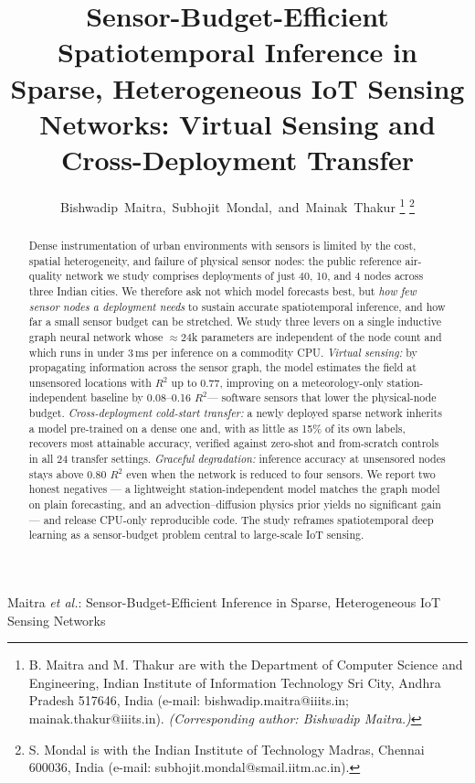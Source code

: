 \documentclass[journal]{IEEEtran}
\newcommand{\Rtwo}{\ensuremath{R^{2}}\xspace}
\begin{document}
\title{Sensor-Budget-Efficient Spatiotemporal Inference in Sparse, Heterogeneous IoT Sensing Networks: Virtual Sensing and Cross-Deployment Transfer}

\author{Bishwadip~Maitra,~Subhojit~Mondal,~and~Mainak~Thakur%
\thanks{B. Maitra and M. Thakur are with the Department of Computer Science and Engineering, Indian Institute of Information Technology Sri City, Andhra Pradesh 517646, India (e-mail: bishwadip.maitra@iiits.in; mainak.thakur@iiits.in). \emph{(Corresponding author: Bishwadip Maitra.)}}%
\thanks{S. Mondal is with the Indian Institute of Technology Madras, Chennai 600036, India (e-mail: subhojit.mondal@smail.iitm.ac.in).}%
}

%
{Maitra \MakeLowercase{\textit{et al.}}: Sensor-Budget-Efficient Inference in Sparse, Heterogeneous IoT Sensing Networks}

\maketitle

\begin{abstract}
Dense instrumentation of urban environments with sensors is limited by the cost, spatial heterogeneity, and failure of physical sensor nodes: the public reference air-quality network we study comprises deployments of just 40, 10, and 4 nodes across three Indian cities. We therefore ask not which model forecasts best, but \emph{how few sensor nodes a deployment needs} to sustain accurate spatiotemporal inference, and how far a small sensor budget can be stretched. We study three levers on a single inductive graph neural network whose ${\approx}24$k parameters are independent of the node count and which runs in under 3\,ms per inference on a commodity CPU. \emph{Virtual sensing:} by propagating information across the sensor graph, the model estimates the field at unsensored locations with \Rtwo up to 0.77, improving on a meteorology-only station-independent baseline by 0.08--0.16 \Rtwo --- software sensors that lower the physical-node budget. \emph{Cross-deployment cold-start transfer:} a newly deployed sparse network inherits a model pre-trained on a dense one and, with as little as 15\% of its own labels, recovers most attainable accuracy, verified against zero-shot and from-scratch controls in all 24 transfer settings. \emph{Graceful degradation:} inference accuracy at unsensored nodes stays above 0.80 \Rtwo even when the network is reduced to four sensors. We report two honest negatives --- a lightweight station-independent model matches the graph model on plain forecasting, and an advection--diffusion physics prior yields no significant gain --- and release CPU-only reproducible code. The study reframes spatiotemporal deep learning as a sensor-budget problem central to large-scale IoT sensing.
\end{abstract}
\end{document}

